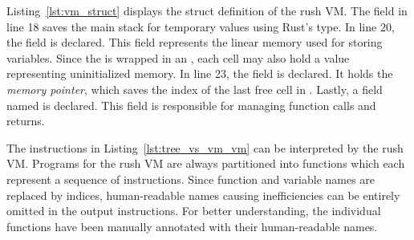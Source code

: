 
Listing~\ref{lst:vm_struct} displays the struct definition of the rush VM\@.
The  field in line 18 saves the main stack for temporary values using Rust's  type.
In line 20, the  field is declared.
This field represents the linear memory used for storing variables.
Since the  is wrapped in an , each cell may also hold a  value representing uninitialized memory.
In line 23, the  field is declared.
It holds the \emph{memory pointer}, which saves the index of the last free cell in .
Lastly, a field named  is declared.
This field is responsible for managing function calls and returns.

The instructions in Listing~\ref{lst:tree_vs_vm_vm} can be interpreted by the rush VM\@.
Programs for the rush VM are always partitioned into functions which each represent a sequence of instructions.
Since function and variable names are replaced by indices, human-readable names causing inefficiencies can be entirely omitted in the output instructions.
For better understanding, the individual functions have been manually annotated with their human-readable names.

